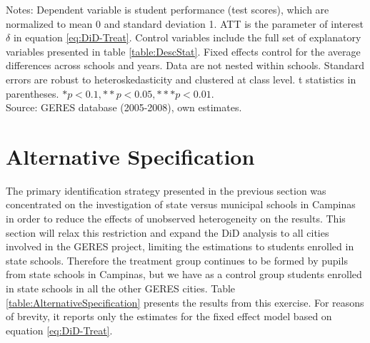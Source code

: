 \documentclass[a4paper, 12pt]{article}
\begin{document}
\begin{table}[H]
\begin{subtable}[t]{\linewidth}
\begin{adjustbox}{max width=\textwidth}
\end{adjustbox}
\end{subtable}           
\begin{minipage}{1\textwidth}            \scriptsize Notes: Dependent variable is student performance (test scores), which are normalized to mean 0 and standard deviation 1. ATT is the parameter of interest $\delta$ in equation \eqref{eq:DiD-Treat}. Control variables include the full set of explanatory variables presented in table \ref{table:DescStat}. Fixed effects control for the average differences across schools and years. Data are not nested within schools. Standard errors are robust to heteroskedasticity and clustered at class level. t statistics in parentheses. \( * p<0.1, ** p<0.05, *** p<0.01 \). \\                    
Source: GERES database (2005-2008), own estimates.             \end{minipage}                \end{table}











\section{Alternative Specification} \label{Paper3-Alternative}
 
The primary identification strategy presented in the previous section was concentrated on the investigation of state versus municipal schools in Campinas in order to reduce the effects of unobserved heterogeneity on the results. This section will relax this restriction and expand the DiD analysis to all cities involved in the GERES project, limiting the estimations to students enrolled in state schools. Therefore the treatment group continues to be formed by pupils from state schools in Campinas, but we have as a control group students enrolled in state schools in all the other GERES cities. Table \ref{table:AlternativeSpecification} presents the results from this exercise. For reasons of brevity, it reports only the estimates for the fixed effect model based on equation \eqref{eq:DiD-Treat}. 
\end{document}
